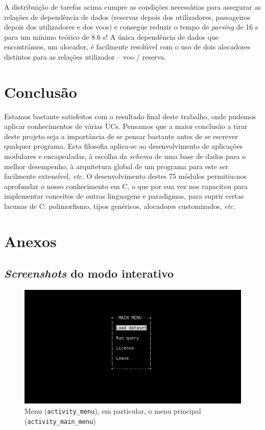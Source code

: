 \documentclass[11pt, a4paper]{article}
\begin{document}
A distribuição de tarefas acima cumpre as condições necessárias para assegurar as relações de
dependência de dados (reservas depois dos utilizadores, passageiros depois dos utilizadores e dos
voos) e consegue reduzir o tempo de \emph{parsing} de 16 s para um mínimo teórico de 8.6 s! A única
dependência de dados que encontrámos, um alocador, é facilmente resolúvel com o uso de dois
alocadores distintos para as relações utilizador -- voo / reserva.

\section{Conclusão}
\label{sec:conclusion}

Estamos bastante satisfeitos com o resultado final deste trabalho, onde pudemos aplicar
conhecimentos de várias UCs. Pensamos que a maior conclusão a tirar deste projeto seja a importância
de se pensar bastante antes de se escrever qualquer programa. Esta filosofia aplica-se ao
desenvolvimento de aplicações modulares e encapsuladas, à escolha da \emph{schema} de uma base de
dados para o melhor desempenho, à arquitetura global de um programa para este ser facilmente
extensível, \emph{etc.} O desenvolvimento destes 75 módulos permitiu-nos aprofundar o nosso
conhecimento em C, o que por sua vez nos capacitou para implementar conceitos de outras linguagens e
paradigmas, para suprir certas lacunas de C: polimorfismo, tipos genéricos, alocadores customizados,
\emph{etc.}

\pagebreak
\section{Anexos}
\label{sec:annexes}

\subsection{\emph{Screenshots} do modo interativo}
\label{sec:interactive-screenshots}

\begin{figure}[H]
    \centering
    \includegraphics[scale=0.25]{res-fase2/interactive_screenshots/main_menu.png}
    \caption{Menu (\texttt{activity\_menu}), em particular, o menu principal
             (\texttt{activity\_main\_menu})}
    \label{fig:main_menu}
\end{figure}
\end{document}
